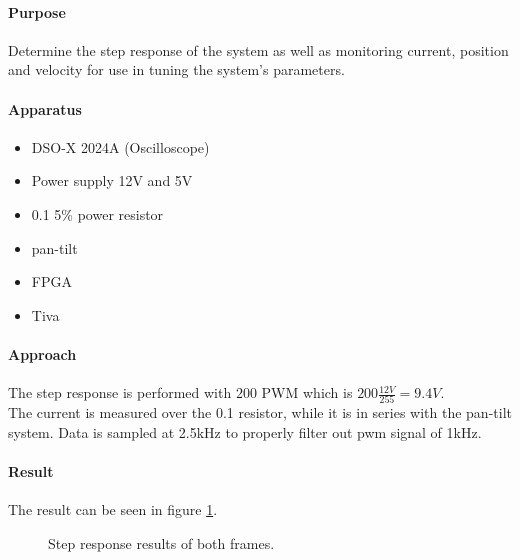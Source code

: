 \documentclass[../../main]{subfiles}
\begin{document}
\paragraph{Purpose}%
\label{par:purpose}

Determine the step response of the system as well as monitoring current, position and velocity for use in tuning the system's parameters.

\paragraph{Apparatus}%
\label{par:apperateur}
\begin{itemize}
	\item DSO-X 2024A (Oscilloscope)
	\item Power supply 12\si{V} and 5\si{V}
	\item 0.1\si{\Omega} 5\% power resistor
	\item pan-tilt
	\item FPGA
	\item Tiva
\end{itemize}


\paragraph{Approach}%
\label{par:approach}
The step response is performed with $200$ PWM which is $200\frac{12\si{V}}{255} = 9.4\si{V}$.\\
The current is measured over the 0.1\si{\Omega} resistor, while it is in series with the pan-tilt system.
Data is sampled at 2.5\si{kHz} to properly filter out pwm signal of 1\si{kHz}.

\paragraph{Result}%
\label{par:result}

The result can be seen in figure \ref{fig:jour_step_bot}.


\begin{figure}[H]
        \centering
				\def\svgwidth{0.47\columnwidth}
				\def\svgwidth{0.47\columnwidth}
				\caption{Step response results of both frames.}
				\label{fig:jour_step_bot}
\end{figure}
\end{document}

